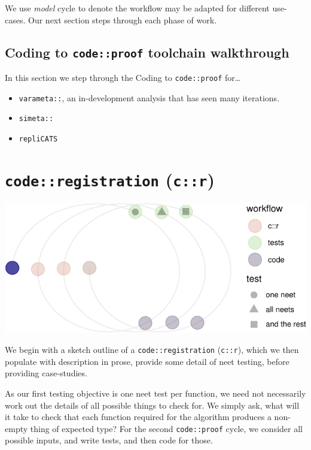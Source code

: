 \documentclass[
]{article}
\providecommand{\tightlist}{%
  \setlength{\itemsep}{0pt}\setlength{\parskip}{0pt}}
\begin{document}
We use \emph{model} cycle to denote the workflow may be adapted for
different use-cases. Our next section steps through each phase of work.

\hypertarget{coding-to-codeproof-toolchain-walkthrough}{%
\subsection{\texorpdfstring{Coding to \texttt{code::proof} toolchain
walkthrough}{Coding to code::proof toolchain walkthrough}}\label{coding-to-codeproof-toolchain-walkthrough}}

In this section we step through the Coding to \texttt{code::proof}
for\ldots{}

\begin{itemize}
\tightlist
\item
  \texttt{varameta::}, an in-development analysis that has seen many
  iterations.\\
\item
  \texttt{simeta::}
\item
  \texttt{repliCATS}
\end{itemize}

\hypertarget{coderegistration-cr}{%
\section{\texorpdfstring{\texttt{code::registration}
(\texttt{c::r})}{code::registration (c::r)}}\label{coderegistration-cr}}

\begin{center}\includegraphics{when-is-done-done_files/figure-latex/unnamed-chunk-3-1} \end{center}

We begin with a sketch outline of a \texttt{code::registration}
(\texttt{c::r}), which we then populate with description in prose,
provide some detail of neet testing, before providing case-studies.

As our first testing objective is one neet test per function, we need
not necessarily work out the details of all possible things to check
for. We simply ask, what will it take to check that each function
required for the algorithm produces a non-empty thing of expected type?
For the second \texttt{code::proof} cycle, we consider all possible
inputs, and write tests, and then code for those.
\end{document}
